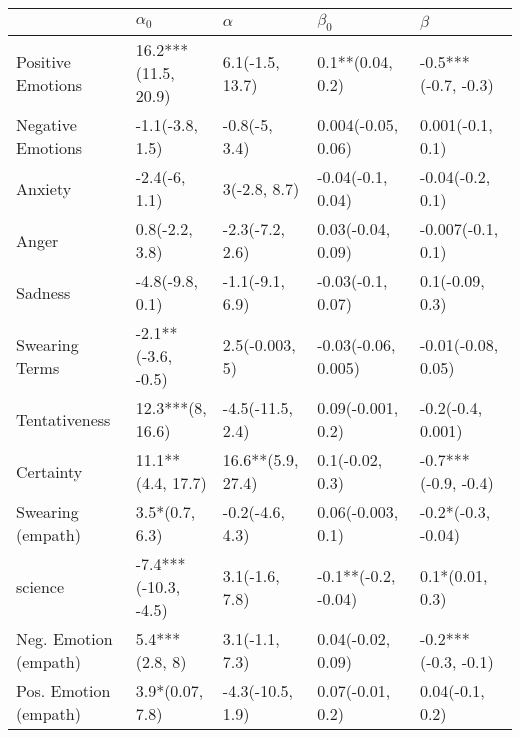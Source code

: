 \begin{tabular}{lllll}
\toprule
{} &            $\alpha_0$ &           $\alpha$ &            $\beta_0$ &              $\beta$ \\
\midrule
Positive Emotions     &   16.2***(11.5, 20.9) &    6.1(-1.5, 13.7) &     0.1**(0.04, 0.2) &  -0.5***(-0.7, -0.3) \\
Negative Emotions     &       -1.1(-3.8, 1.5) &      -0.8(-5, 3.4) &   0.004(-0.05, 0.06) &     0.001(-0.1, 0.1) \\
Anxiety               &         -2.4(-6, 1.1) &       3(-2.8, 8.7) &    -0.04(-0.1, 0.04) &     -0.04(-0.2, 0.1) \\
Anger                 &        0.8(-2.2, 3.8) &    -2.3(-7.2, 2.6) &    0.03(-0.04, 0.09) &    -0.007(-0.1, 0.1) \\
Sadness               &       -4.8(-9.8, 0.1) &    -1.1(-9.1, 6.9) &    -0.03(-0.1, 0.07) &      0.1(-0.09, 0.3) \\
Swearing Terms        &    -2.1**(-3.6, -0.5) &     2.5(-0.003, 5) &  -0.03(-0.06, 0.005) &   -0.01(-0.08, 0.05) \\
Tentativeness         &      12.3***(8, 16.6) &   -4.5(-11.5, 2.4) &    0.09(-0.001, 0.2) &    -0.2(-0.4, 0.001) \\
Certainty             &     11.1**(4.4, 17.7) &  16.6**(5.9, 27.4) &      0.1(-0.02, 0.3) &  -0.7***(-0.9, -0.4) \\
Swearing (empath)     &        3.5*(0.7, 6.3) &    -0.2(-4.6, 4.3) &    0.06(-0.003, 0.1) &   -0.2*(-0.3, -0.04) \\
science               &  -7.4***(-10.3, -4.5) &     3.1(-1.6, 7.8) &  -0.1**(-0.2, -0.04) &      0.1*(0.01, 0.3) \\
Neg. Emotion (empath) &        5.4***(2.8, 8) &     3.1(-1.1, 7.3) &    0.04(-0.02, 0.09) &  -0.2***(-0.3, -0.1) \\
Pos. Emotion (empath) &       3.9*(0.07, 7.8) &   -4.3(-10.5, 1.9) &     0.07(-0.01, 0.2) &      0.04(-0.1, 0.2) \\
\bottomrule
\end{tabular}

